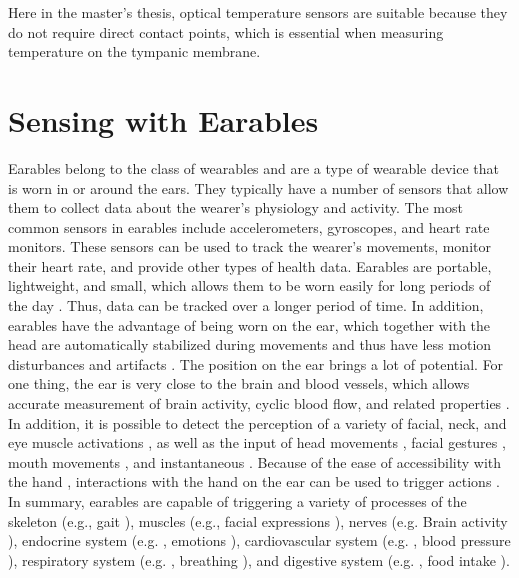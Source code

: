 Here in the master's thesis, optical temperature sensors are suitable because they do not require direct contact points, which is essential when measuring temperature on the tympanic membrane.

\section{Sensing with Earables}
\label{Background:SensingWithEarables}
Earables belong to the class of wearables and are a type of wearable device that is worn in or around the ears. 
They typically have a number of sensors that allow them to collect data about the wearer's physiology and activity. 
The most common sensors in earables include accelerometers, gyroscopes, and heart rate monitors. 
These sensors can be used to track the wearer's movements, monitor their heart rate, and provide other types of health data.
Earables are portable, lightweight, and small, which allows them to be worn easily for long periods of the day \cite{roddigerSensingEarablesSystematic2022a}. Thus, data can be tracked over a longer period of time. In addition, earables have the advantage of being worn on the ear, which together with the head are automatically stabilized during movements and thus have less motion disturbances and artifacts \cite{grossmanFrequencyVelocityRotational1988, kavanaghRoleNeckTrunk2006a}.
The position on the ear brings a lot of potential. For one thing, the ear is very close to the brain and blood vessels, which allows accurate measurement of brain activity, cyclic blood flow, and related properties \cite{ferliniInEarPPGVital2022}.
In addition, it is possible to detect the perception of a variety of facial, neck, and eye muscle activations \cite{andoCanalSenseFaceRelatedMovement2017}, as well as the input of head movements \cite{andoCanalSenseFaceRelatedMovement2017}, facial gestures \cite{matthiesEarFieldSensingNovelInEar2017}, mouth movements \cite{sunTeethTapRecognizingDiscrete2021a}, and instantaneous \cite{bleichnerConcealedUnobtrusiveEarCentered2017, phamWAKEBehindtheearWearable2020}. 
Because of the ease of accessibility with the hand \cite{kikuchiEarTouchTurningEar2017, xuEarBuddyEnablingOnFace2020}, interactions with the hand on the ear can be used to trigger actions \cite{lissermannEarPutAugmentingEarworn2014}.
In summary, earables are capable of triggering a variety of processes of the skeleton (e.g., gait \cite{atallahGaitAsymmetryDetection2014}), muscles (e.g., facial expressions \cite{matthiesEarFieldSensingNovelInEar2017}), nerves (e.g. Brain activity \cite{debenerUnobtrusiveAmbulatoryEEG2015}), endocrine system (e.g. , emotions \cite{athavipachWearableInEarEEG2019}), cardiovascular system (e.g. , blood pressure \cite{atallahValidationEarwornSensor2012}), respiratory system (e.g. , breathing \cite{roddigerRespirationRateMonitoring2020}), and digestive system (e.g. , food intake \cite{gaoIHearFoodEating2016}).

